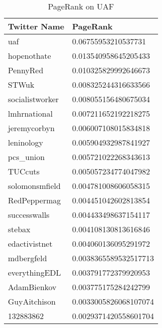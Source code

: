 \begin{table}[htbp]%
\centering
\begin{tabular}{|l|l|}
\hline
Twitter Name & PageRank \\
\hline
uaf & 0.06755953210537731 \\
hopenothate & 0.013540958645205433 \\
PennyRed & 0.010325829992646673 \\
STWuk & 0.008325244316633566 \\
socialistworker & 0.008055156480675034 \\
lmhrnational & 0.007211652192218275 \\
jeremycorbyn & 0.006007108015834818 \\
leninology & 0.005904932987841927 \\
pcs\_union & 0.005721022268343613 \\
TUCcuts & 0.005057234774047982 \\
solomonsmfield & 0.004781008606058315 \\
RedPeppermag & 0.004451042602813854 \\
successwalls & 0.004433498637154117 \\
stebax & 0.004108130813616846 \\
edactivistnet & 0.004060136095291972 \\
mdbergfeld & 0.0038365589532517713 \\
everythingEDL & 0.003791772379920953 \\
AdamBienkov & 0.003775175284242799 \\
GuyAitchison & 0.0033005826068107074 \\
132883862 & 0.0029371420558601704 \\
\hline
\end{tabular}
\caption{PageRank on UAF}
\label{tab:uafpagerank}
\end{table}

